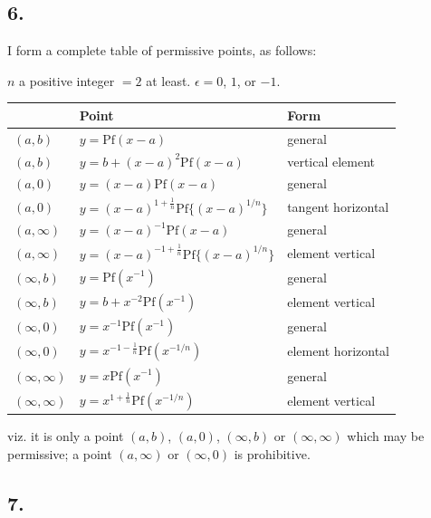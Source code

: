 \documentclass[11pt,a4paper]{book}
\providecommand{\Pf}{\mathrm{Pf}}
\begin{document}
\subsection*{6.}

I form a complete table of permissive points, as follows:

$n$ a positive integer $= 2$ at least. $\epsilon = 0$, $1$, or $-1$.

\begin{center}
\begin{tabular}{|l|l|l|}
\hline
 & \textbf{Point} & \textbf{Form} \\
\hline
$(a, b)$ & $y = \Pf(x - a)$ & general \\
$(a, b)$ & $y = b + (x - a)^2 \Pf(x - a)$ & vertical element \\
$(a, 0)$ & $y = (x - a) \Pf(x - a)$ & general \\
$(a, 0)$ & $y = (x - a)^{1 + \frac{1}{n}} \Pf\{(x - a)^{1/n}\}$ & tangent horizontal \\
$(a, \infty)$ & $y = (x - a)^{-1} \Pf(x - a)$ & general \\
$(a, \infty)$ & $y = (x - a)^{-1 + \frac{1}{n}} \Pf\{(x - a)^{1/n}\}$ & element vertical \\
$(\infty, b)$ & $y = \Pf(x^{-1})$ & general \\
$(\infty, b)$ & $y = b + x^{-2} \Pf(x^{-1})$ & element vertical \\
$(\infty, 0)$ & $y = x^{-1} \Pf(x^{-1})$ & general \\
$(\infty, 0)$ & $y = x^{-1 - \frac{1}{n}} \Pf(x^{-1/n})$ & element horizontal \\
$(\infty, \infty)$ & $y = x \Pf(x^{-1})$ & general \\
$(\infty, \infty)$ & $y = x^{1 + \frac{1}{n}} \Pf(x^{-1/n})$ & element vertical \\
\hline
\end{tabular}
\end{center}

viz. it is only a point $(a, b)$, $(a, 0)$, $(\infty, b)$ or $(\infty, \infty)$ which may be permissive; a point $(a, \infty)$ or $(\infty, 0)$ is prohibitive.

\subsection*{7.}
\end{document}
